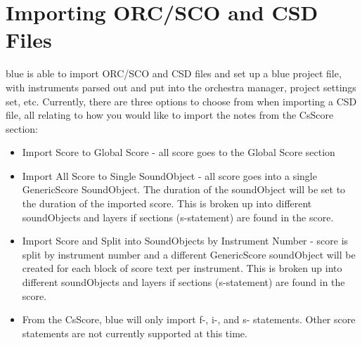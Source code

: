 \section{Importing ORC/SCO and CSD Files}\label{importCSD}

blue is able to import ORC/SCO and CSD files and set up a blue project
file, with instruments parsed out and put into the orchestra manager,
project settings set, etc. Currently, there are three options to choose
from when importing a CSD file, all relating to how you would like to
import the notes from the CsScore section:

\begin{itemize}
\item
  Import Score to Global Score - all score goes to the Global Score
  section
\item
  Import All Score to Single SoundObject - all score goes into a single
  GenericScore SoundObject. The duration of the soundObject will be set
  to the duration of the imported score. This is broken up into
  different soundObjects and layers if sections (s-statement) are found
  in the score.
\item
  Import Score and Split into SoundObjects by Instrument Number - score
  is split by instrument number and a different GenericScore soundObject
  will be created for each block of score text per instrument. This is
  broken up into different soundObjects and layers if sections
  (s-statement) are found in the score.
\end{itemize}

\begin{itemize}
\item
  From the CsScore, blue will only import f-, i-, and s- statements.
  Other score statements are not currently supported at this time.
\end{itemize}
